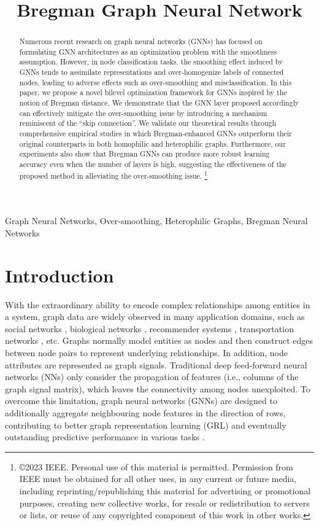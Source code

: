 \documentclass{article}
\title{Bregman Graph Neural Network}
\newcommand\blfootnote[1]{\begingroup
  \renewcommand\thefootnote{}\footnote{#1}\addtocounter{footnote}{-1}\endgroup
}
\renewcommand\thefootnote{\textcolor{blue}{\arabic{footnote}}}
\begin{document}
\maketitle
\begin{abstract}
Numerous recent research on graph neural networks (GNNs) has focused on formulating GNN architectures as an optimization problem with the smoothness assumption. However, in node classification tasks, the smoothing effect induced by GNNs tends to assimilate representations and over-homogenize labels of connected nodes, leading to adverse effects such as over-smoothing and misclassification.
In this paper, we propose a novel bilevel optimization framework for GNNs inspired by the notion of Bregman distance. We demonstrate that the GNN layer proposed accordingly can effectively mitigate the over-smoothing issue by introducing a mechanism reminiscent of the ``skip connection''.
We validate our theoretical results through comprehensive empirical studies in which Bregman-enhanced GNNs outperform their original counterparts in both homophilic and heterophilic graphs. Furthermore, our experiments also show that Bregman GNNs can produce more robust learning accuracy even when the number of layers is high, suggesting the effectiveness of the proposed method in alleviating the over-smoothing issue.
\blfootnote{\copyright 2023 IEEE. Personal use of this material is permitted. Permission from IEEE must be obtained for all other uses, in any current or future media, including reprinting/republishing this material for advertising or promotional purposes, creating new collective works, for resale or redistribution to servers or lists, or reuse of any copyrighted component of this work in other works.}


\end{abstract}
\begin{keywords}
Graph Neural Networks, Over-smoothing, Heterophilic Graphs, Bregman Neural Networks
\end{keywords}


\section{Introduction}\label{Sec:1}
\label{sec:intro}
With the extraordinary ability to encode complex relationships among entities in a system, graph data are widely observed in many application domains, such as social networks \cite{fan2019graph, social1}, biological networks \cite{bio1}, recommender systems \cite{wu2022graph,ying2018graph}, transportation networks \cite{zheng2020gman, trans1}, etc. Graphs normally model entities as nodes and then construct edges between node pairs to represent underlying relationships. In addition, node attributes are represented as graph signals. Traditional deep feed-forward neural networks (NNs) only consider the propagation of features (i.e., columns of the graph signal matrix), which leaves the connectivity among nodes unexploited. To overcome this limitation, graph neural networks (GNNs) are designed to additionally aggregate neighbouring node features in the direction of rows, contributing to better graph representation learning (GRL) and eventually outstanding predictive performance in various tasks \cite{zhou2020graph}.
\end{document}
